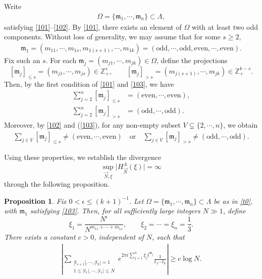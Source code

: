 \documentclass[10pt,a4paper]{amsart}
\newtheorem{proposition}{Proposition}\numberwithin{proposition}{section}
\numberwithin{equation}{section}
\begin{document}
Write
\begin{align}\label{t0}
\Omega=\{\mathfrak{m}_1,\cdots,\mathfrak{m}_n\}\subset \Lambda,
\end{align}
satisfying \eqref{101}--\eqref{102}. By \eqref{101}, there exists an element of  $ \Omega$ with at least two odd components. Without loss of generality, we may assume that for some $s\ge 2$,
\begin{align}\label{103}
\mathfrak{m}_1=(m_{11},\cdots,m_{1s},m_{1(s+1)},\cdots,m_{1k})
=(\text{odd},\cdots,\text{odd},\text{even},\cdots,\text{even}).
\end{align}
Fix such an $s$.
For each $\mathfrak{m}_j=(m_{j1},\cdots,m_{jk})\in \Omega$, define the projections
\[
[\mathfrak{m}_j]_{\le s}=(m_{j1},\cdots,m_{js})\in \mathbb{Z}_+^s,
\qquad
[\mathfrak{m}_j]_{>s}=(m_{j(s+1)},\cdots,m_{jk})\in \mathbb{Z}_+^{k-s}.
\]
Then, by the first condition of \eqref{101} and \eqref{103}, we have
\begin{align}
\sum_{j=2}^n[\mathfrak{m}_j]_{\le s}&=(\text{even},\cdots,\text{even}),\label{104} \\
\sum_{j=2}^n[\mathfrak{m}_j]_{>s}&=(\text{odd},\cdots,\text{odd}).\label{1044}
\end{align}
Moreover, by   \eqref{102} and (\ref{103}),  for any non-empty subset $V\subsetneq \{2,\cdots,n\}$, we obtain
\begin{align}\label{105}
\sum_{j\in V } [\mathfrak{m}_j]_{\le s} \neq (\text{even},\cdots,\text{even})
\quad \text{or} \quad
\sum_{j\in V } [\mathfrak{m}_j]_{> s} \neq (\text{odd},\cdots,\text{odd}).
\end{align}

Using these properties, we establish the divergence
$$
\sup_{\vec N,\xi}\bigl|H_{\vec N}^{\Lambda}(\xi)\bigr|=\infty
$$
through the following proposition.


\begin{proposition}\label{h450}
 Fix  $0<\epsilon\le (k+1)^{-1}$. Let $\Omega=\{\mathfrak{m}_1,\cdots,\mathfrak{m}_n\}\subset \Lambda$ be as in \eqref{t0}, with $\mathfrak{m}_1$ satisfying \eqref{103}.  Then, for all sufficiently large integers $N\gg 1$, define
\[
\xi_1=\frac{N^{\epsilon}}{N^{m_{11}+\cdots+m_{1s}}},
\qquad
\xi_2=\cdots=\xi_n=\frac{1}{3}.
\]
There exists a constant $c>0$, independent of $N$, such that
\begin{align}\label{0487}
\left|\sum_{\substack{|t_{s+1}|,\cdots,|t_k|=1 \\ 1\le |t_1|,\cdots,|t_s|\le N}}
e^{2\pi i \sum_{j=1}^n \xi_j t^{\mathfrak{m}_j}}
\frac{1}{t_1\cdots t_k}\right|
\ge c\log N.
\end{align}
\end{proposition}
\end{document}
